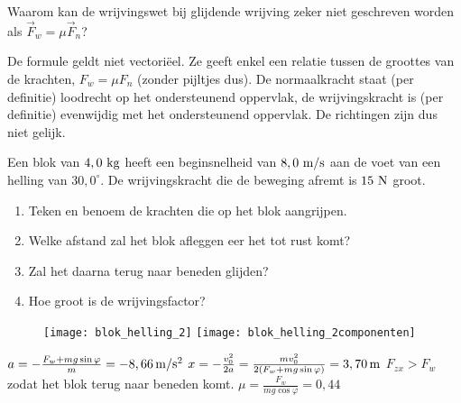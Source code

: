 




        \author{Bert Lambregs}

\begin{exercise} Waarom kan de wrijvingswet bij glijdende wrijving zeker niet geschreven worden als $\vec{F}_w=\mu\vec{F}_n$?
\begin{oplossing}
\newline
De formule geldt niet vectori\"eel. Ze geeft enkel een relatie
tussen de groottes van de krachten, $F_w=\mu F_n$ (zonder pijltjes
dus). De normaalkracht staat (per definitie) loodrecht op het
ondersteunend oppervlak, de wrijvingskracht is (per definitie)
evenwijdig met het onder\-steu\-nend oppervlak. De richtingen zijn
dus niet gelijk.
\end{oplossing}

\end{exercise}

\begin{exercise}[Opgave] Een blok van $4,0~\rm kg$ heeft een beginsnelheid van $8,0~\rm m/s$ aan de voet van een helling van $30,0^\circ$. De wrijvingskracht die de beweging afremt is $15~\rm N$ groot.
\begin{enumerate}
\item Teken en benoem de krachten die op het blok aangrijpen.
\item Welke afstand zal het blok afleggen eer het tot rust komt?
\item Zal het daarna terug naar beneden glijden?
\item Hoe groot is de wrijvingsfactor?
\end{enumerate}
\begin{oplossing}
\begin{figure}[h]
\begin{flushright}
\texttt{[image: blok\_helling\_2]}
\texttt{[image: blok\_helling\_2componenten]}
\end{flushright}
\end{figure}
$a=-\frac{F_w+mg\sin\varphi}{m}=-8,66\rm\,m/s^2$
\newline
$x=-\frac{v_0^2}{2a}=\frac{mv_0^2}{2(F_w+mg\sin\varphi)}=3,70\rm\,m$ %
\newline
$F_{zx}>F_w$ zodat het blok terug naar beneden komt. 
\newline
$\mu=\frac{F_w}{mg\cos\varphi}=0,44$
\end{oplossing}



\end{exercise}

